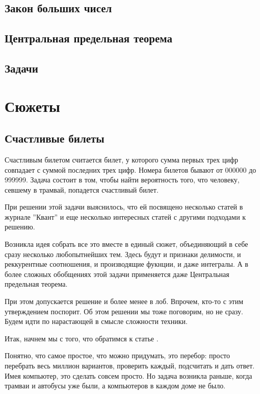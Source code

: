 \documentclass[a4paper,12pt]{article}
\begin{document}
\subsection*{Закон больших чисел}

\subsection*{Центральная предельная теорема}

\subsection*{Задачи}


\section*{Сюжеты}
\subsection*{Счастливые билеты}

Счастливым билетом считается билет, у которого сумма первых трех цифр совпадает с суммой последних трех цифр. Номера билетов бывают от 000000 до 999999. Задача состоит в том, чтобы найти вероятность того, что человеку, севшему в трамвай, попадется счастливый билет.

При решении этой задачи выяснилось, что ей посвящено несколько статей в журнале ''Квант'' и еще несколько интересных статей с другими подходами к решению.

Возникла идея собрать все это вместе в единый сюжет, объединяющий в себе сразу несколько любопытнейших тем. Здесь будут и признаки делимости, и реккурентные соотношения, и производящие фукнции, и даже интегралы. А в более сложных обобщениях этой задачи применяется даже Центральная предельная теорема.

При этом допускается решение и более менее в лоб. Впрочем, кто-то с этим утверждением поспорит. Об этом решении мы тоже поговорим, но не сразу. Будем идти по нарастающей в смысле сложности техники.

Итак, начнем мы с того, что обратимся к статье \cite{TalkInTram}. 

Понятно, что самое простое, что можно придумать, это перебор: просто перебрать весь миллион вариантов, проверить каждый, подсчитать и дать ответ. Имея компьютер, это сделать совсем просто. Но задача возникла раньше, когда трамваи и автобусы уже были, а компьютеров в каждом доме не было.
\end{document}
